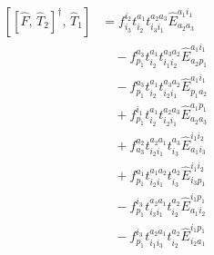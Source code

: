 \documentclass[11pt]{article}
\begin{document}
\begin{align}
\left[\left[\hat{F},\, \hat{T}_{2}\right]^{\dagger},\, \hat{T}_{1}\right] &= f^{i_{2}}_{i_{3}} t^{a_{1}}_{i_{2}} t^{a_{2}a_{3}}_{i_{3}i_{1}} \hat{E}^{a_{1}i_{1}}_{a_{2}a_{3}} \\
&\quad - f^{a_{3}}_{p_{1}} t^{a_{1}}_{i_{2}} t^{a_{3}a_{2}}_{i_{1}i_{2}} \hat{E}^{a_{1}i_{1}}_{a_{2}p_{1}} \\
&\quad - f^{a_{3}}_{p_{1}} t^{a_{1}}_{i_{2}} t^{a_{3}a_{2}}_{i_{2}i_{1}} \hat{E}^{a_{1}i_{1}}_{p_{1}a_{2}} \\
&\quad + f^{i_{1}}_{p_{1}} t^{a_{1}}_{i_{2}} t^{a_{2}a_{3}}_{i_{2}i_{1}} \hat{E}^{a_{1}p_{1}}_{a_{2}a_{3}} \\
&\quad + f^{a_{2}}_{a_{3}} t^{a_{2}a_{1}}_{i_{2}i_{1}} t^{a_{3}}_{i_{3}} \hat{E}^{i_{1}i_{2}}_{a_{1}i_{3}} \\
&\quad + f^{a_{1}}_{p_{1}} t^{a_{1}a_{2}}_{i_{2}i_{1}} t^{a_{2}}_{i_{3}} \hat{E}^{i_{1}i_{2}}_{i_{3}p_{1}} \\
&\quad - f^{i_{3}}_{p_{1}} t^{a_{2}a_{1}}_{i_{3}i_{1}} t^{a_{2}}_{i_{2}} \hat{E}^{i_{1}p_{1}}_{a_{1}i_{2}} \\
&\quad - f^{i_{3}}_{p_{1}} t^{a_{2}a_{1}}_{i_{1}i_{3}} t^{a_{2}}_{i_{2}} \hat{E}^{i_{1}p_{1}}_{i_{2}a_{1}}
\end{align}
\end{document}

